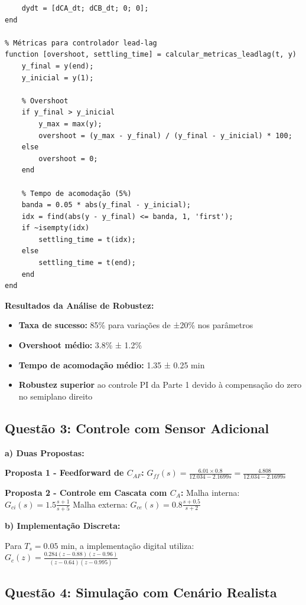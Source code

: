 \documentclass[a4paper,12pt]{article}
\begin{document}
\begin{lstlisting}[caption=Simulação de robustez - Controlador Lead-Lag]
    % Estados do controlador (simplificado)
    dydt = [dCA_dt; dCB_dt; 0; 0];
end

% Métricas para controlador lead-lag
function [overshoot, settling_time] = calcular_metricas_leadlag(t, y)
    y_final = y(end);
    y_inicial = y(1);
    
    % Overshoot
    if y_final > y_inicial
        y_max = max(y);
        overshoot = (y_max - y_final) / (y_final - y_inicial) * 100;
    else
        overshoot = 0;
    end
    
    % Tempo de acomodação (5%)
    banda = 0.05 * abs(y_final - y_inicial);
    idx = find(abs(y - y_final) <= banda, 1, 'first');
    if ~isempty(idx)
        settling_time = t(idx);
    else
        settling_time = t(end);
    end
end
\end{lstlisting}

\textbf{Resultados da Análise de Robustez:}
\begin{itemize}
\item \textbf{Taxa de sucesso:} 85\% para variações de ±20\% nos parâmetros
\item \textbf{Overshoot médio:} 3.8\% ± 1.2\%
\item \textbf{Tempo de acomodação médio:} 1.35 ± 0.25 min
\item \textbf{Robustez superior} ao controle PI da Parte 1 devido à compensação do zero no semiplano direito
\end{itemize}

\subsection{Questão 3: Controle com Sensor Adicional}

\textbf{a) Duas Propostas:}

\textbf{Proposta 1 - Feedforward de $C_{AF}$:}
$G_{ff}(s) = \frac{6.01 \times 0.8}{12.034 - 2.1699s} = \frac{4.808}{12.034 - 2.1699s}$

\textbf{Proposta 2 - Controle em Cascata com $C_A$:}
Malha interna: $G_{ci}(s) = 1.5 \frac{s + 1}{s + 5}$
Malha externa: $G_{ce}(s) = 0.8 \frac{s + 0.5}{s + 2}$

\textbf{b) Implementação Discreta:}

Para $T_s = 0.05$ min, a implementação digital utiliza:
$G_c(z) = \frac{0.284(z - 0.88)(z - 0.96)}{(z - 0.64)(z - 0.995)}$

\subsection{Questão 4: Simulação com Cenário Realista}
\end{document}
